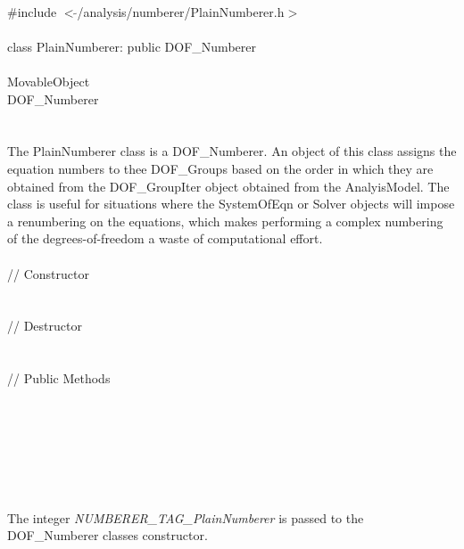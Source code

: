 
   \\
\indent \#include $<\tilde{ }$/analysis/numberer/PlainNumberer.h$>$  \\

  \\
\indent class PlainNumberer: public DOF\_Numberer  \\

 \\
\indent MovableObject \\
\indent\indent DOF\_Numberer \\
\indent\indent{} \\

 \\ 
\indent The PlainNumberer class is a DOF\_Numberer. An object of this
class assigns the equation numbers to thee DOF\_Groups based on the
order in which they are obtained from the DOF\_GroupIter object
obtained from the AnalyisModel. The class is useful for situations
where the SystemOfEqn or Solver objects will impose a renumbering on
the equations, which makes performing a complex numbering of the
degrees-of-freedom a waste of computational effort. \\


 \\
\indent // Constructor \\
\\ \\
\indent // Destructor \\
\\  \\
\indent // Public Methods \\
 \\
 \\
\\ 
\\ \\


 \\
\\ 
The integer {\em NUMBERER\_TAG\_PlainNumberer} is passed to the
DOF\_Numberer classes constructor. \\

